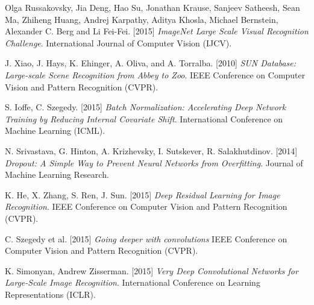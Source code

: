 \begin{thebibliography}{99}

	\bigskip
	
	Olga Russakovsky, Jia Deng, Hao Su, Jonathan Krause, Sanjeev Satheesh, 
	Sean Ma, Zhiheng Huang, Andrej Karpathy, Aditya Khosla, Michael Bernstein, 
	Alexander C. Berg and Li Fei-Fei. [2015]
	\textit{ImageNet Large Scale Visual Recognition Challenge}. 
	International Journal of Computer Vision (IJCV).
	 
	 J. Xiao, J. Hays, K. Ehinger, A. Oliva, and A. Torralba. [2010]
	 \textit{SUN Database: Large-scale Scene Recognition from Abbey to Zoo}.
	 IEEE Conference on Computer Vision and Pattern Recognition (CVPR).
	 
	 S. Ioffe, C. Szegedy. [2015]
	 \textit{Batch Normalization: Accelerating Deep Network Training by 
	 Reducing Internal Covariate Shift}. 
	 International Conference on Machine Learning (ICML).
	 
	 N. Srivastava, G. Hinton, A. Krizhevsky, I. Sutskever, R. Salakhutdinov. [2014]
	 \textit{Dropout: A Simple Way to Prevent Neural Networks from Overfitting}.
	 Journal of Machine Learning Research.
	 
	 K. He, X. Zhang, S. Ren, J. Sun. [2015]
	 \textit{Deep Residual Learning for Image Recognition}.
	 IEEE Conference on Computer Vision and Pattern Recognition (CVPR).
	 
	 C. Szegedy et al. [2015]
	 \textit{Going deeper with convolutions}
	 IEEE Conference on Computer Vision and Pattern Recognition (CVPR).
	 
	 K. Simonyan, Andrew Zisserman. [2015]
	 \textit{Very Deep Convolutional Networks for Large-Scale Image Recognition}.
	 International Conference on Learning Representations (ICLR).
	 
	 
	
\end{thebibliography}
